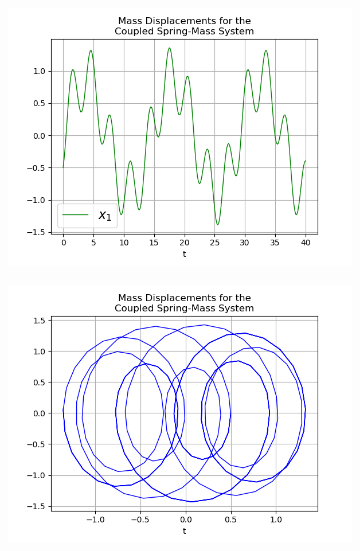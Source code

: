 \documentclass{article}
\begin{document}
\begin{figure}[h!]
\begin{subfigure}[b]{0.32\linewidth}
    \caption{}
  \end{subfigure}
  \begin{subfigure}[b]{0.32\linewidth}
    \includegraphics[width=\linewidth]{two_springs233.png}
    \caption{}
  \end{subfigure}
  \begin{subfigure}[b]{0.45\linewidth}
    \includegraphics[width=\linewidth]{two_springs234.png}
    \caption{}
  \end{subfigure}
  \begin{subfigure}[b]{0.45\linewidth}

\end{subfigure}
\end{figure}
\end{document}
